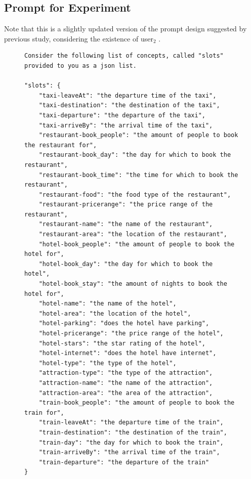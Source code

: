 \newpage
\subsection{Prompt for Experiment}
\label{app:prompt-experiment}

Note that this is a slightly updated version of the prompt design suggested by previous study, considering the existence of user$_2$ \cite{heck2023chatgpt}.

\begin{figure}[h]
    \centering
\begin{lstlisting}
Consider the following list of concepts, called "slots" provided to you as a json list.

"slots": {   
    "taxi-leaveAt": "the departure time of the taxi",
    "taxi-destination": "the destination of the taxi",
    "taxi-departure": "the departure of the taxi",
    "taxi-arriveBy": "the arrival time of the taxi",
    "restaurant-book_people": "the amount of people to book the restaurant for",
    "restaurant-book_day": "the day for which to book the restaurant",
    "restaurant-book_time": "the time for which to book the restaurant",
    "restaurant-food": "the food type of the restaurant",
    "restaurant-pricerange": "the price range of the restaurant",
    "restaurant-name": "the name of the restaurant",
    "restaurant-area": "the location of the restaurant",
    "hotel-book_people": "the amount of people to book the hotel for",
    "hotel-book_day": "the day for which to book the hotel",
    "hotel-book_stay": "the amount of nights to book the hotel for",
    "hotel-name": "the name of the hotel",
    "hotel-area": "the location of the hotel",
    "hotel-parking": "does the hotel have parking",
    "hotel-pricerange": "the price range of the hotel",
    "hotel-stars": "the star rating of the hotel",
    "hotel-internet": "does the hotel have internet",
    "hotel-type": "the type of the hotel",
    "attraction-type": "the type of the attraction",
    "attraction-name": "the name of the attraction",
    "attraction-area": "the area of the attraction",
    "train-book_people": "the amount of people to book the train for",
    "train-leaveAt": "the departure time of the train",
    "train-destination": "the destination of the train",
    "train-day": "the day for which to book the train",
    "train-arriveBy": "the arrival time of the train",
    "train-departure": "the departure of the train"
}


\end{lstlisting}
\end{figure}
